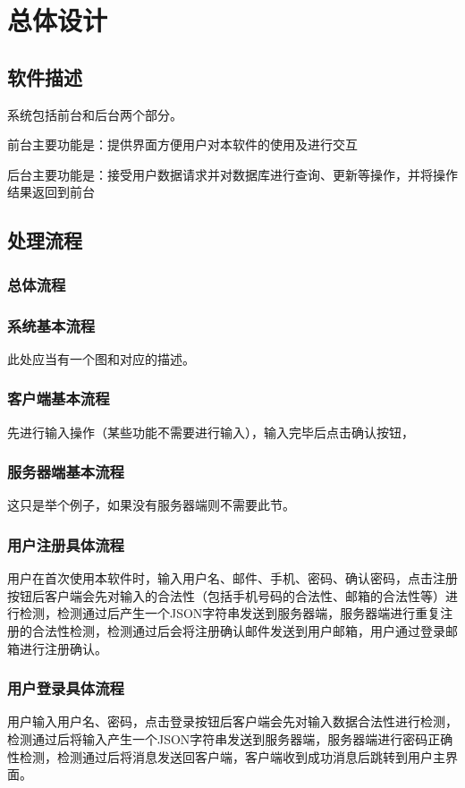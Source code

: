 \chapter{总体设计}
\section{软件描述}
系统包括前台和后台两个部分。

前台主要功能是：提供界面方便用户对本软件的使用及进行交互

后台主要功能是：接受用户数据请求并对数据库进行查询、更新等操作，并将操作结果返回到前台

\section{处理流程}
\subsection{总体流程}


\subsection{系统基本流程}
此处应当有一个图和对应的描述。

\subsection{客户端基本流程}
先进行输入操作（某些功能不需要进行输入），输入完毕后点击确认按钮，

\subsection{服务器端基本流程}
这只是举个例子，如果没有服务器端则不需要此节。

\subsection{用户注册具体流程}
用户在首次使用本软件时，输入用户名、邮件、手机、密码、确认密码，点击注册按钮后客户端会先对输入的合法性（包括手机号码的合法性、邮箱的合法性等）进行检测，检测通过后产生一个JSON字符串发送到服务器端，服务器端进行重复注册的合法性检测，检测通过后会将注册确认邮件发送到用户邮箱，用户通过登录邮箱进行注册确认。


\subsection{用户登录具体流程}
用户输入用户名、密码，点击登录按钮后客户端会先对输入数据合法性进行检测，检测通过后将输入产生一个JSON字符串发送到服务器端，服务器端进行密码正确性检测，检测通过后将消息发送回客户端，客户端收到成功消息后跳转到用户主界面。

